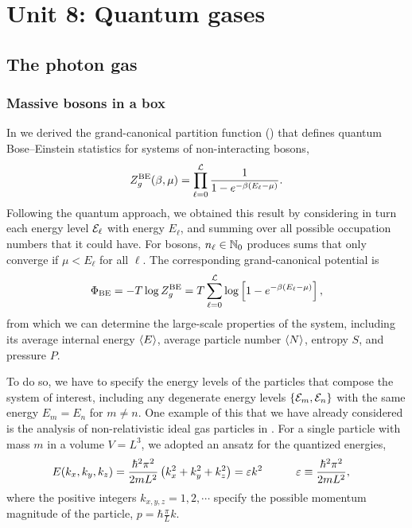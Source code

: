 \renewcommand{\thisunit}{MATH327 Unit 8}
\renewcommand{\moddate}{Last modified 2 Apr.~2025}
\setcounter{section}{8}
\setcounter{subsection}{0}
{}
\section*{Unit 8: Quantum gases}
\subsection{\label{sec:photon}The photon gas}
\subsubsection{Massive bosons in a box}
In  we derived the grand-canonical partition function () that defines quantum Bose--Einstein statistics for systems of non-interacting bosons,
\begin{equation*}
  Z_g^{\text{BE}}(\beta, \mu) = \prod_{\ell = 0}^{\mathcal L} \frac{1}{1 - e^{-\beta (E_{\ell} - \mu)}}.
\end{equation*}
Following the quantum approach, we obtained this result by considering in turn each energy level $\mathcal E_{\ell}$ with energy $E_{\ell}$, and summing over all possible occupation numbers that it could have.
For bosons, $n_{\ell} \in \mathbb N_0$ produces sums that only converge if $\mu < E_{\ell}$ for all $\ell$.
The corresponding grand-canonical potential is
\begin{equation*}
  \Phi_{\text{BE}} = -T \log Z_g^{\text{BE}} = T \sum_{\ell = 0}^{\mathcal L} \log\left[1 - e^{-\beta (E_{\ell} - \mu)}\right],
\end{equation*}
from which we can determine the large-scale properties of the system, including its average internal energy $\left\langle E \right\rangle$, average particle number $\left\langle N \right\rangle$, entropy $S$, and pressure $P$.

To do so, we have to specify the energy levels of the particles that compose the system of interest, including any degenerate energy levels $\left\{\mathcal E_m, \mathcal E_n\right\}$ with the same energy $E_m = E_n$ for $m \neq n$.
One example of this that we have already considered is the analysis of non-relativistic ideal gas particles in .
For a single particle with mass $m$ in a volume $V = L^3$, we adopted an ansatz for the quantized energies,
\begin{align}
  \label{eq:nonrel_energy}
  E(k_x, k_y, k_z) & = \frac{\hbar^2 \pi^2}{2mL^2}\left(k_x^2 + k_y^2 + k_z^2\right) = \varepsilon k^2 \qquad &
  \varepsilon & \equiv \frac{\hbar^2 \pi^2}{2mL^2},
\end{align}
where the positive integers $k_{x, y, z} = 1, 2, \cdots$ specify the possible momentum magnitude of the particle, $p = \hbar \frac{\pi}{L} k$.

